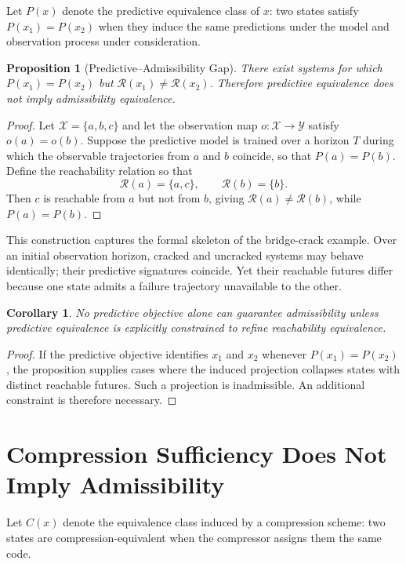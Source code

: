 \documentclass[12pt,a4paper]{article}
\theoremstyle{plain}
\newtheorem{proposition}{Proposition}
\newtheorem{corollary}{Corollary}
\theoremstyle{definition}
\theoremstyle{remark}
\begin{document}
Let $P(x)$ denote the predictive equivalence class of $x$: two states satisfy
$P(x_1) = P(x_2)$ when they induce the same predictions under the model and
observation process under consideration.

\begin{proposition}[Predictive--Admissibility Gap]
There exist systems for which $P(x_1) = P(x_2)$ but
$\mathcal{R}(x_1) \neq \mathcal{R}(x_2)$. Therefore predictive equivalence
does not imply admissibility equivalence.
\end{proposition}

\begin{proof}
Let $\mathcal{X} = \{a, b, c\}$ and let the observation map $o : \mathcal{X}
\to \mathcal{Y}$ satisfy $o(a) = o(b)$. Suppose the predictive model is
trained over a horizon $T$ during which the observable trajectories from $a$
and $b$ coincide, so that $P(a) = P(b)$. Define the reachability relation so
that
\[
  \mathcal{R}(a) = \{a, c\}, \qquad \mathcal{R}(b) = \{b\}.
\]
Then $c$ is reachable from $a$ but not from $b$, giving
$\mathcal{R}(a) \neq \mathcal{R}(b)$, while $P(a) = P(b)$.
\end{proof}

This construction captures the formal skeleton of the bridge-crack example.
Over an initial observation horizon, cracked and uncracked systems may behave
identically; their predictive signatures coincide. Yet their reachable futures
differ because one state admits a failure trajectory unavailable to the other.

\begin{corollary}
No predictive objective alone can guarantee admissibility unless predictive
equivalence is explicitly constrained to refine reachability equivalence.
\end{corollary}

\begin{proof}
If the predictive objective identifies $x_1$ and $x_2$ whenever
$P(x_1) = P(x_2)$, the proposition supplies cases where the induced projection
collapses states with distinct reachable futures. Such a projection is
inadmissible. An additional constraint is therefore necessary.
\end{proof}

\section{Compression Sufficiency Does Not Imply Admissibility}

Let $C(x)$ denote the equivalence class induced by a compression scheme:
two states are compression-equivalent when the compressor assigns them the same
code.
\end{document}

